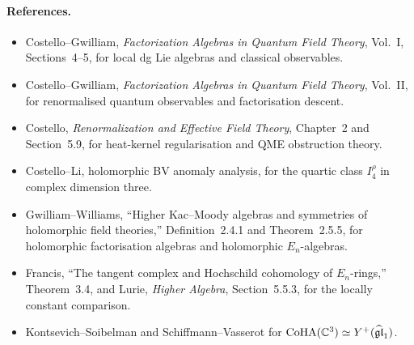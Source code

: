 \paragraph{References.}
\begin{itemize}
  \item Costello--Gwilliam, \emph{Factorization Algebras in Quantum
  Field Theory}, Vol.~I, Sections~4--5, for local dg Lie algebras and
  classical observables.
  \item Costello--Gwilliam, \emph{Factorization Algebras in Quantum
  Field Theory}, Vol.~II, for renormalised quantum observables and
  factorisation descent.
  \item Costello, \emph{Renormalization and Effective Field Theory},
  Chapter~2 and Section~5.9, for heat-kernel regularisation and QME
  obstruction theory.
  \item Costello--Li, holomorphic BV anomaly analysis, for the quartic
  class \(I_4^\rho\) in complex dimension three.
  \item Gwilliam--Williams, ``Higher Kac--Moody algebras and symmetries
  of holomorphic field theories,'' Definition~2.4.1 and Theorem~2.5.5,
  for holomorphic factorisation algebras and holomorphic
  \(E_n\)-algebras.
  \item Francis, ``The tangent complex and Hochschild cohomology of
  \(E_n\)-rings,'' Theorem~3.4, and Lurie, \emph{Higher Algebra},
  Section~5.5.3, for the locally constant comparison.
  \item Kontsevich--Soibelman and Schiffmann--Vasserot for
  \(\mathrm{CoHA}(\mathbb{C}^3)\simeq Y^+(\widehat{\mathfrak{gl}}_1)\).
\end{itemize}
